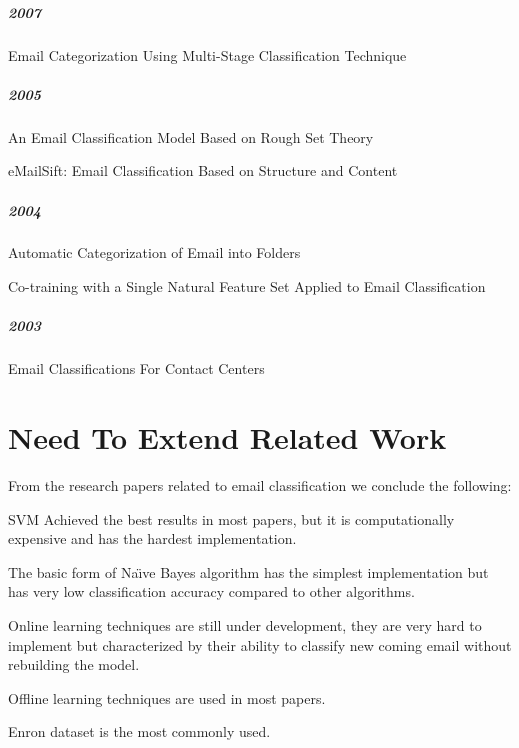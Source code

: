 \subparagraph{2007}
\begin{my_itemize}
  \item Email Categorization Using Multi-Stage Classification Technique \cite{MD07}
\end{my_itemize}

\subparagraph{2005}
\begin{my_itemize}
  \item An Email Classification Model Based on Rough Set Theory \cite{WENQING05}
  \item eMailSift: Email Classification Based on Structure and Content \cite{sift01}
\end{my_itemize}

\subparagraph{2004}
\begin{my_itemize}
  \item Automatic Categorization of Email into Folders \cite{RON04}
  \item Co-training with a Single Natural Feature Set Applied to Email Classification \cite{mous04}
\end{my_itemize}

\subparagraph{2003}
\begin{my_itemize}
  \item Email Classifications For Contact Centers \cite{ANI03}
\end{my_itemize}


\section{Need To Extend Related Work}
From the research papers related to email classification we conclude the following:
\begin{my_itemize}
    \item SVM Achieved the best results in most papers, but it is computationally expensive and has the hardest implementation.
    \item The basic form of Na\"{\i}ve Bayes algorithm has the simplest implementation but has very low classification accuracy compared to other algorithms.
    \item Online learning techniques are still under development, they are very hard to implement but characterized by their
    ability to classify new coming email without rebuilding the model.
    \item Offline learning techniques are used in most papers.
    \item Enron dataset is the most commonly used.
\end{my_itemize}


